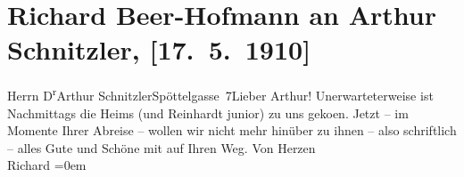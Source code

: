 

         
         \renewcommand{\erwaehntePersonen}{Personen: Richard Beer-Hofmann, Else Heims, Wolfgang Reinhardt}
         \renewcommand{\erwaehnteOrte}{Orte: Edmund-Weiß-Gasse, Wien}
         \renewcommand{\erwaehnteWerke}{}
               \section[Richard Beer-Hofmann an Arthur Schnitzler, {[}17. 5. 1910{]}]{ Richard Beer-Hofmann an Arthur Schnitzler, {[}17. 5. 1910{]}}\nopagebreak{}\rehead{ }\begin{ledgroupsized}[t]{13cm}\normalsize\beginnumbering \toendnotes[C]{\smallbreak\pagebreak[2]} 
\pstart{}{\pb}Herrn D\textsuperscript{r}\pend{}\pstart{}Arthur Schnitzler\pend{}\pstart{}Spöttelgasse 7\pend{}{\bigskip}\pstart{}{\pb}Lieber Arthur!\pend\pstart
           Unerwarteterweise ist Nachmittags die Heims (und Reinhardt junior) zu uns
                  geko{\geminationm}en. Jetzt – im Momente Ihrer Abreise – wollen
               wir nicht {\pb}mehr hinüber zu ihnen –
               also schriftlich – alles Gute und Schöne mit auf Ihren Weg.\pend
           \pstart
           Von Herzen{\\[\baselineskip]}\spacefill\mbox{Richard}\pend
           \leftskip=0em{}
         
         \endnumbering{}\end{ledgroupsized}  \newcommand{\dateiname}{L01932}\newcommand{\titel}{Richard Beer-Hofmann an Arthur Schnitzler, [17. 5. 1910]}\newcommand{\editorInnen}{Martin Anton Müller und Gerd-Hermann Susen}
      